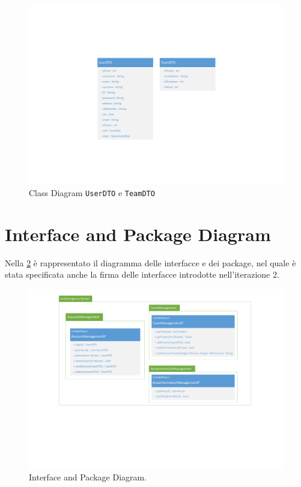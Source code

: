 \begin{figure}[h!]
	\centering
	\includegraphics[width=1\linewidth]{./Iterazione 2/OtherFiles/DTOSpecification}
	\caption{Class Diagram \texttt{UserDTO} e \texttt{TeamDTO}}
	\label{fig:ClassDiagramDTO_iterazione2}
\end{figure}

\clearpage

\section{Interface and Package Diagram}
Nella \Fig\ref{fig:InterfaceDiagram_iterazione2} è rappresentato il diagramma delle interfacce e dei package, nel quale è stata specificata anche la firma delle interfacce introdotte nell'iterazione 2.

\begin{figure}[h]
	\centering
	\includegraphics[width=1\linewidth]{./Iterazione 2/OtherFiles/UML - Interface Diagram}
	\caption{Interface and Package Diagram.}
	\label{fig:InterfaceDiagram_iterazione2}
\end{figure}
